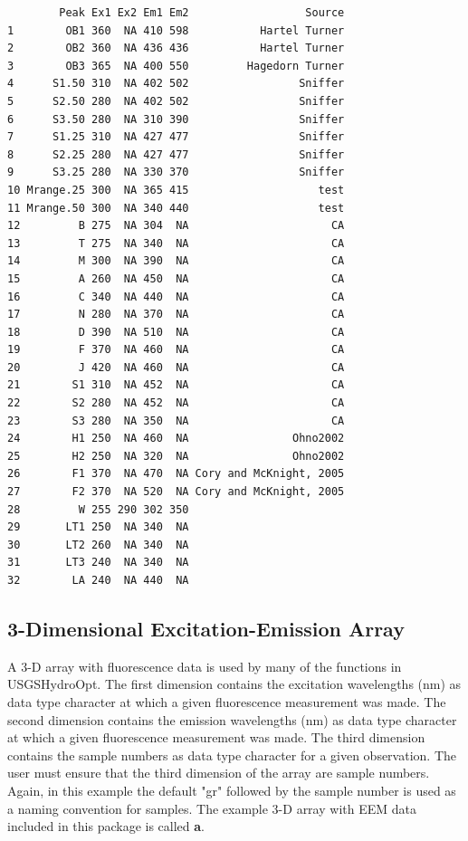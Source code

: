 \documentclass[a4paper,11pt]{article}\usepackage[]{graphicx}\usepackage[]{color}
\makeatletter
\newenvironment{kframe}{%
 \def\at@end@of@kframe{}%
 \ifinner\ifhmode%
  \def\at@end@of@kframe{\end{minipage}}%
  \begin{minipage}{\columnwidth}%
 \fi\fi%
 \def\FrameCommand##1{\hskip\@totalleftmargin \hskip-\fboxsep
 \colorbox{shadecolor}{##1}\hskip-\fboxsep
     \hskip-\linewidth \hskip-\@totalleftmargin \hskip\columnwidth}%
 \MakeFramed {\advance\hsize-\width
   \@totalleftmargin\z@ \linewidth\hsize
   \@setminipage}}%
 {\par\unskip\endMakeFramed%
 \at@end@of@kframe}
\newenvironment{knitrout}{}{} %
\makeatother
\begin{document}
\begin{knitrout}
\color{fgcolor}\begin{kframe}
\begin{verbatim}
        Peak Ex1 Ex2 Em1 Em2                  Source
1        OB1 360  NA 410 598           Hartel Turner
2        OB2 360  NA 436 436           Hartel Turner
3        OB3 365  NA 400 550         Hagedorn Turner
4      S1.50 310  NA 402 502                 Sniffer
5      S2.50 280  NA 402 502                 Sniffer
6      S3.50 280  NA 310 390                 Sniffer
7      S1.25 310  NA 427 477                 Sniffer
8      S2.25 280  NA 427 477                 Sniffer
9      S3.25 280  NA 330 370                 Sniffer
10 Mrange.25 300  NA 365 415                    test
11 Mrange.50 300  NA 340 440                    test
12         B 275  NA 304  NA                      CA
13         T 275  NA 340  NA                      CA
14         M 300  NA 390  NA                      CA
15         A 260  NA 450  NA                      CA
16         C 340  NA 440  NA                      CA
17         N 280  NA 370  NA                      CA
18         D 390  NA 510  NA                      CA
19         F 370  NA 460  NA                      CA
20         J 420  NA 460  NA                      CA
21        S1 310  NA 452  NA                      CA
22        S2 280  NA 452  NA                      CA
23        S3 280  NA 350  NA                      CA
24        H1 250  NA 460  NA                Ohno2002
25        H2 250  NA 320  NA                Ohno2002
26        F1 370  NA 470  NA Cory and McKnight, 2005
27        F2 370  NA 520  NA Cory and McKnight, 2005
28         W 255 290 302 350                        
29       LT1 250  NA 340  NA                        
30       LT2 260  NA 340  NA                        
31       LT3 240  NA 340  NA                        
32        LA 240  NA 440  NA                        
\end{verbatim}
\end{kframe}
\end{knitrout}

\subsection{3-Dimensional Excitation-Emission Array}
A 3-D array with fluorescence data is used by many of the functions in USGSHydroOpt. The first dimension contains the excitation wavelengths (nm) as data type character at which a given fluorescence measurement was made. The second dimension contains the emission wavelengths (nm) as data type character at which a given fluorescence measurement was made. The third dimension contains the sample numbers as data type character for a given observation. The user must ensure that the third dimension of the array are sample numbers. Again, in this example the default "gr" followed by the sample number is used as a naming convention for samples. The example 3-D array with EEM data included in this package is called \textbf{a}.
\end{document}
